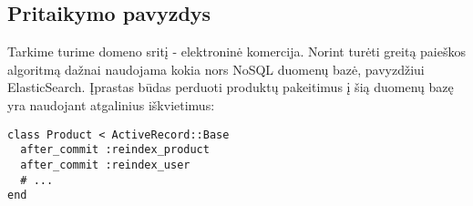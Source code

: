 

\subsection{Pritaikymo pavyzdys}

Tarkime turime domeno sritį - elektroninė komercija. Norint turėti greitą paieškos algoritmą dažnai naudojama kokia nors NoSQL duomenų bazė, pavyzdžiui ElasticSearch. Įprastas būdas perduoti produktų pakeitimus į šią duomenų bazę yra naudojant atgalinius iškvietimus:

\begin{lstlisting}[]
class Product < ActiveRecord::Base
  after_commit :reindex_product
  after_commit :reindex_user
  # ...
end
\end{lstlisting}

